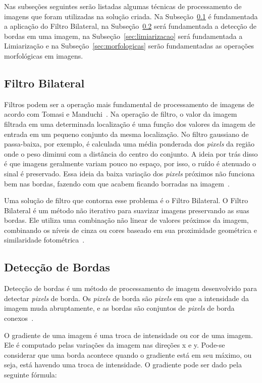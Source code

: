 Nas subseções seguintes serão listadas algumas técnicas de processamento de
imagens que foram utilizadas na solução criada. Na
Subseção~\ref{sec:bilateralfilter} é fundamentada a aplicação do Filtro
Bilateral, na Subseção~\ref{sec:detecbordas} será fundamentada a detecção de
bordas em uma imagem, na Subseção~\ref{sec:limiarizacao} será fundamentada a
Limiarização e na Subseção~\ref{sec:morfologicas} serão fundamentadas as
operações morfológicas em imagens.

\subsection{Filtro Bilateral}
\label{sec:bilateralfilter}

Filtros podem ser a operação mais fundamental de processamento de imagens de
acordo com Tomasi e Manduchi~\cite{tomasi1998bilateral}. Na operação de filtro,
o valor da imagem filtrada em uma determinada localização é uma função dos
valores da imagem de entrada em um pequeno conjunto da mesma localização. No
filtro gaussiano de passa-baixa, por exemplo, é calculada uma média ponderada
dos \emph{pixels} da região onde o peso diminui com a distância do centro do
conjunto. A ideia por trás disso é que imagens geralmente variam pouco no
espaço, por isso, o ruído é atenuado o sinal é preservado. Essa ideia da baixa
variação dos \emph{pixels} próximos não funciona bem nas bordas, fazendo com que
acabem ficando borradas na imagem~\cite{tomasi1998bilateral}.

Uma solução de filtro que contorna esse problema é o Filtro Bilateral. O Filtro Bilateral é um método não iterativo para suavizar imagens preservando as suas bordas. Ele utiliza uma combinação não linear de valores próximos da imagem, combinando os níveis de cinza ou cores baseado em sua proximidade geométrica e similaridade fotométrica~\cite{tomasi1998bilateral}.

\subsection{Detecção de Bordas}
\label{sec:detecbordas}

Detecção de bordas é um método de processamento de imagem desenvolvido para detectar \emph{pixels} de borda. Os \emph{pixels} de borda são \emph{pixels} em que a intensidade da imagem muda abruptamente, e as bordas são conjuntos de \emph{pixels} de borda conexos~\cite{gonzalez1977digital}.

O gradiente de uma imagem é uma troca de intensidade ou cor de uma imagem. Ele é computado pelas variações da imagem nas direções x e y. Pode-se considerar que uma borda acontece quando o gradiente está em seu máximo, ou seja, está havendo uma troca de intensidade. O gradiente pode ser dado pela seguinte fórmula:

